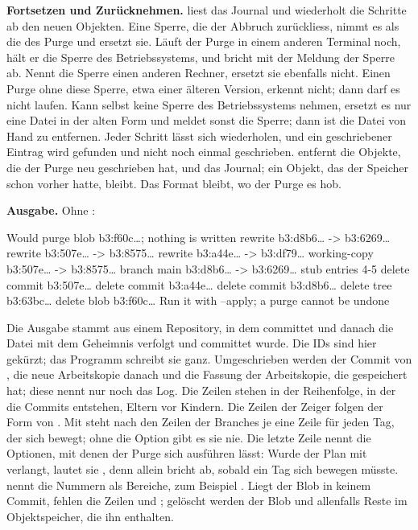 {\bf Fortsetzen und Zurücknehmen.}  liest das Journal und wiederholt die
Schritte ab den neuen Objekten. Eine Sperre, die der Abbruch zurückliess, nimmt es als die
des Purge und ersetzt sie. Läuft der Purge in einem anderen Terminal noch, hält er die Sperre
des Betriebssystems, und  bricht mit der Meldung der Sperre ab.
Nennt die Sperre einen anderen Rechner, ersetzt  sie ebenfalls nicht.
Einen Purge ohne diese Sperre, etwa einer älteren Version, erkennt  nicht;
dann darf es nicht laufen.
Kann  selbst keine Sperre des Betriebssystems nehmen, ersetzt es nur eine Datei
in der alten Form und meldet sonst die Sperre; dann ist die Datei von Hand zu entfernen.
Jeder Schritt lässt sich wiederholen, und ein geschriebener Eintrag
 wird gefunden und nicht noch einmal geschrieben.  entfernt die
Objekte, die der Purge neu geschrieben hat, und das Journal; ein Objekt, das der Speicher
schon vorher hatte, bleibt. Das Format bleibt, wo der Purge es hob.

{\bf Ausgabe.} Ohne :

\starttyping
Would purge blob b3:f60c…; nothing is written
    rewrite b3:d8b6… -> b3:6269…
    rewrite b3:507e… -> b3:8575…
    rewrite b3:a44e… -> b3:df79…
    working-copy  b3:507e… -> b3:8575…
    branch main  b3:d8b6… -> b3:6269…
    stub entries 4-5
    delete commit b3:507e…
    delete commit b3:a44e…
    delete commit b3:d8b6…
    delete tree b3:63bc…
    delete blob b3:f60c…
Run it with --apply; a purge cannot be undone
\stoptyping

Die Ausgabe stammt aus einem Repository, in dem  committet und danach
die Datei  mit dem Geheimnis verfolgt und committet wurde. Die IDs sind hier gekürzt;
das Programm schreibt sie ganz. Umgeschrieben werden der Commit von , die neue
Arbeitskopie danach und die Fassung der Arbeitskopie, die  gespeichert hat;
diese nennt nur noch das Log.
Die Zeilen  stehen in der Reihenfolge, in der die Commits entstehen,
Eltern vor Kindern. Die Zeilen der Zeiger folgen der Form von .
Mit  steht nach den Zeilen der Branches je eine Zeile
 für jeden Tag, der sich bewegt; ohne die Option gibt es sie nie.
Die letzte Zeile nennt die Optionen, mit denen der Purge sich ausführen lässt:
Wurde der Plan mit  verlangt, lautet sie
, denn  allein
bricht ab, sobald ein Tag sich bewegen müsste.
 nennt die Nummern als Bereiche, zum Beispiel .
Liegt der Blob in keinem Commit, fehlen die Zeilen  und ;
gelöscht werden der Blob und allenfalls Reste im Objektspeicher, die ihn enthalten.

